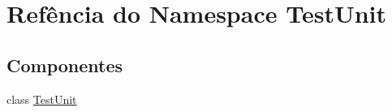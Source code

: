 \hypertarget{namespaceTestUnit}{\section{Refência do Namespace Test\-Unit}
\label{namespaceTestUnit}
}
\subsection*{Componentes}
\begin{DoxyCompactItemize}
\item 
class \hyperlink{classTestUnit_1_1TestUnit}{Test\-Unit}
\end{DoxyCompactItemize}
